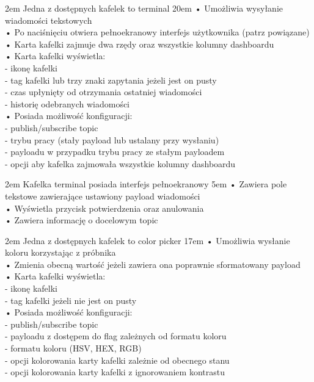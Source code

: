 {2em}{
    Jedna z dostępnych kafelek to terminal
}
{20em}{
    • Umożliwia wysyłanie wiadomości tekstowych\\
    • Po naciśnięciu otwiera pełnoekranowy interfejs użytkownika (patrz powiązane)\\
    • Karta kafelki zajmuje dwa rzędy oraz wszystkie kolumny dashboardu\\

    • Karta kafelki wyświetla:\\
    - ikonę kafelki\\
    - tag kafelki lub trzy znaki zapytania jeżeli jest on pusty\\
    - czas upłynięty od otrzymania ostatniej wiadomości\\
    - historię odebranych wiadomości\\

    • Posiada możliwość konfiguracji:\\
    - publish/subscribe topic\\
    - trybu pracy (stały payload lub ustalany przy wysłaniu)\\
    - payloadu w przypadku trybu pracy ze stałym payloadem\\
    - opcji aby kafelka zajmowała wszystkie kolumny dashboardu
}

{2em}{
    Kafelka terminal posiada interfejs pełnoekranowy
}
{5em}{
    • Zawiera pole tekstowe zawierające ustawiony payload wiadomości\\
    • Wyświetla przycisk potwierdzenia oraz anulowania\\
    • Zawiera informację o docelowym topic
}

{2em}{
    Jedna z dostępnych kafelek to color picker
}
{17em}{
    • Umożliwia wysłanie koloru korzystając z próbnika\\
    • Zmienia obecną wartość jeżeli zawiera ona poprawnie sformatowany payload\\

    • Karta kafelki wyświetla:\\
    - ikonę kafelki\\
    - tag kafelki jeżeli nie jest on pusty\\

    • Posiada możliwość konfiguracji:\\
    - publish/subscribe topic\\
    - payloadu z dostępem do flag zależnych od formatu koloru\\
    - formatu koloru (HSV, HEX, RGB)\\
    - opcji kolorowania karty kafelki zależnie od obecnego stanu\\
    - opcji kolorowania karty kafelki z ignorowaniem kontrastu
}

